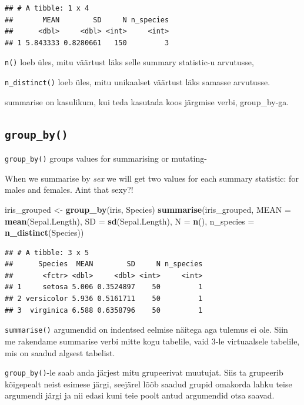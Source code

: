 \documentclass[]{book}
\newenvironment{Shaded}{\begin{snugshade}}{\end{snugshade}}
\newcommand{\KeywordTok}[1]{\textcolor[rgb]{0.13,0.29,0.53}{\textbf{#1}}}
\newcommand{\DataTypeTok}[1]{\textcolor[rgb]{0.13,0.29,0.53}{#1}}
\newcommand{\StringTok}[1]{\textcolor[rgb]{0.31,0.60,0.02}{#1}}
\newcommand{\NormalTok}[1]{#1}
\begin{document}
\begin{verbatim}
## # A tibble: 1 x 4
##       MEAN        SD     N n_species
##      <dbl>     <dbl> <int>     <int>
## 1 5.843333 0.8280661   150         3
\end{verbatim}

\texttt{n()} loeb üles, mitu väärtust läks selle summary statistic-u
arvutusse,

\texttt{n\_distinct()} loeb üles, mitu unikaalset väärtust läks samasse
arvutusse.

summarise on kasulikum, kui teda kasutada koos järgmise verbi,
group\_by-ga.

\subsection{\texorpdfstring{\texttt{group\_by()}}{group\_by()}}\label{group_by}

\texttt{group\_by()} groups values for summarising or mutating-

When we summarise by \emph{sex} we will get two values for each summary
statistic: for males and females. Aint that sexy?!

\begin{Shaded}
\begin{Highlighting}[]
\NormalTok{iris_grouped <-}\StringTok{ }\KeywordTok{group_by}\NormalTok{(iris, Species) }
\KeywordTok{summarise}\NormalTok{(iris_grouped, }
          \DataTypeTok{MEAN =} \KeywordTok{mean}\NormalTok{(Sepal.Length), }
          \DataTypeTok{SD =} \KeywordTok{sd}\NormalTok{(Sepal.Length), }
          \DataTypeTok{N =} \KeywordTok{n}\NormalTok{(), }
          \DataTypeTok{n_species =} \KeywordTok{n_distinct}\NormalTok{(Species))}
\end{Highlighting}
\end{Shaded}

\begin{verbatim}
## # A tibble: 3 x 5
##      Species  MEAN        SD     N n_species
##       <fctr> <dbl>     <dbl> <int>     <int>
## 1     setosa 5.006 0.3524897    50         1
## 2 versicolor 5.936 0.5161711    50         1
## 3  virginica 6.588 0.6358796    50         1
\end{verbatim}

\texttt{summarise()} argumendid on indentsed eelmise näitega aga tulemus
ei ole. Siin me rakendame summarise verbi mitte kogu tabelile, vaid 3-le
virtuaalsele tabelile, mis on saadud algsest tabelist.

\texttt{group\_by()}-le saab anda järjest mitu grupeerivat muutujat.
Siis ta grupeerib kõigepealt neist esimese järgi, seejärel lõõb saadud
grupid omakorda lahku teise argumendi järgi ja nii edasi kuni teie poolt
antud argumendid otsa saavad.
\end{document}

